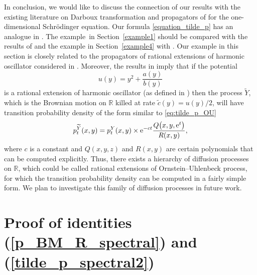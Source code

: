\documentclass[pdftex]{sigma}
\numberwithin{equation}{section}
\theoremstyle{definition}
\def\r{{\mathbb R}}
\begin{document}
In conclusion, we would like to discuss the connection of our results with the existing literature on Darboux transformation and propagators of
for the one-dimensional Schr\"odinger equation. Our formula \eqref{equation_tilde_p} has an analogue in \cite[Theorem~2]{Pupasov_2007}.
The example~in Section~\ref{example1} should be compared with the results of \cite{Pupasov_2005} and the example in Section~\ref{example4} with \cite[Example~5.1]{Pupasov_2007}.
Our example in this section is closely related to the propagators of rational extensions of harmonic oscillator considered in \cite{Pupasov_2015}. Moreover, the results in \cite{Pupasov_2015} imply that if the potential
\[
u(y)=y^2 + \frac{a(y)}{b(y)}
\]
is a rational extension of harmonic oscillator (as defined in \cite{Ullate_2014}) then the process $\widetilde Y$, which is the Brownian motion on $\r$ killed at rate $\tilde c(y)=u(y)/2$, will have transition probability density of the form similar to \eqref{eq:tilde_p_OU}
\[
p_t^{\widetilde Y}(x,y)=p_t^Y(x,y) \times {\rm e}^{-c t} \frac{Q\bigl(x,y,{\rm e}^{t}\bigr)}{R(x,y)},
\]
where $c$ is a constant and $Q(x,y,z)$ and $R(x,y)$ are certain polynomials that can be computed explicitly. Thus, there exists a hierarchy of diffusion processes on $\r$, which could be called rational extensions of Ornstein--Uhlenbeck process, for which the transition probability density can be computed in a fairly simple form. We plan to investigate this family of diffusion processes in future work.

\appendix

\section[Proof of identities (5.7) and (5.8)]{Proof of identities (\ref{p_BM_R_spectral}) and (\ref{tilde_p_spectral2})}\label{AppendixA}
\end{document}
